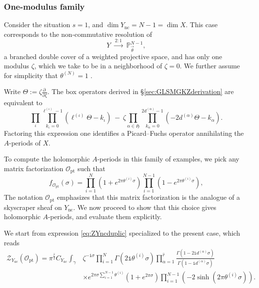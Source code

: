 \documentclass[12pt,a4paper,oneside]{amsart}
\numberwithin{equation}{section}
\theoremstyle{definition}
\theoremstyle{remark}
\newcommand{\cP}{\mathbb{P}}
\newcommand{\mz}{\mathcal{Z}}
\newcommand{\Ync}{Y_{\mathrm{nc}}}
\newcommand{\ii}{\mathtt{i}}
\begin{document}
\subsubsection{One-modulus family}
Consider the situation $s=1$, and $\dim \Ync = N-1 = \dim X$. This case corresponds to the non-commutative resolution of 
\begin{equation*}
    Y \ \xrightarrow{ \ 2:1 \ } \ \cP^{N-1}_{\vec{\theta}} ,    
\end{equation*}
a branched double cover of a weighted projective space, and has only one modulus $\zeta$, which we take to be in a neighborhood of $\zeta =0$. We further assume for simplicity that $\theta^{(N)}=1$ \cite{Hosono:1993qy}.\par
Write $\Theta := \zeta \frac{\partial \ }{\partial \zeta}$. The box operators derived in \S\ref{sec:GLSMGKZderivation} are equivalent to
\begin{equation*}
    \prod_{\iota } \prod_{k_{\iota}=0}^{\ell^{(\iota)} -1} \left( \ell^{(\iota)} \Theta - k_{\iota} \right) \ - \ \zeta \prod_{\alpha \in \mathfrak{H}} \prod_{k_{\alpha}=0}^{2d^{(\alpha)} -1} \left( -2d^{(\alpha)} \Theta - k_{\alpha} \right) .
\end{equation*}
Factoring this expression one identifies a Picard--Fuchs operator annihilating the $A$-periods of $X$.\par
To compute the holomorphic $A$-periods in this family of examples, we pick any matrix factorization $\mathcal{O}_{\mathrm{pt}}$ such that 
\begin{equation*}
    f_{\mathcal{O}_{\mathrm{pt}}} (\sigma) = \prod_{i=1}^{N}\left( 1+e^{2\pi \theta^{(i)}\sigma } \right) \prod_{i=1}^{N-1}\left( 1-e^{2\pi \theta^{(i)}\sigma } \right) ,
\end{equation*}
The notation $\mathcal{O}_{\mathrm{pt}} $ emphasizes that this matrix factorization is the analogue of a skyscraper sheaf on $\Ync$. We now proceed to show that this choice gives holomorphic $A$-periods, and evaluate them explicitly.\par
We start from expression \eqref{eq:ZYncduplic} specialized to the present case, which reads 
\begin{equation*}
\begin{aligned}
    \mz_{\Ync} \left( \mathcal{O}_{\mathrm{pt}}\right) = \pi^{\frac{\hat{r}}{2}} C_{\Ync} \int_{\gamma} & \zeta^{- \ii \sigma} \prod_{i=1}^{N} \Gamma \left( 2 \ii \theta^{(i)} \sigma\right) \prod_{\alpha=1}^{\hat{r}} \frac{ \Gamma \left( 1-2 \ii d^{(\alpha)} \sigma \right) }{\Gamma \left( 1-\ii d^{(\alpha)} \sigma \right)} \\
    &\times e^{2\pi \sigma \sum_{i=1}^{N-1} \theta^{(i)} } \left( 1+e^{2 \pi \sigma} \right) \prod_{i=1 }^{N-1} \left( -2 \sinh \left( 2 \pi \theta^{(i)} \sigma \right) \right) .
\end{aligned}
\end{equation*}
\end{document}
